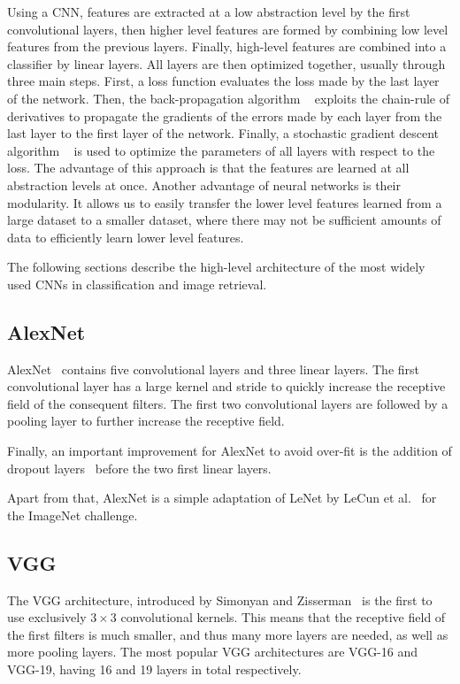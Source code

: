 Using a CNN, features are extracted at a low abstraction level by the
first convolutional layers, then higher level features are formed
by combining low level features from the previous layers. Finally,
high-level features are combined into a classifier by linear layers.
All layers are then optimized together, usually through three main steps.
First, a loss function evaluates the loss made by the last layer of
the network. Then, the back-propagation algorithm
~\cite{rumelhart_learning_1988} exploits the chain-rule of derivatives
to propagate the gradients of the errors made by each layer from the
last layer to the first layer of the network. Finally, a stochastic
gradient descent algorithm
~\cite{bottou_stochastic_2012,bottou_large-scale_2010,rumelhart_learning_1985}
is used to optimize the parameters of all layers with respect to the loss.
The advantage of this approach is that the features are learned at all
abstraction levels at once. Another advantage of neural networks is their
modularity. It allows us to easily transfer the lower level features
learned from a large dataset to a smaller dataset, where there may not
be sufficient amounts of data to efficiently learn lower level features.

The following sections describe the high-level architecture of the
most widely used CNNs in classification and image retrieval.
\subsection{AlexNet}
AlexNet~\cite{krizhevsky_imagenet_2012} contains five convolutional
layers and three linear layers. The first convolutional layer
has a large kernel and stride to quickly increase the receptive field
of the consequent filters. The first two convolutional layers are followed
by a pooling layer to further increase the receptive field.

Finally, an important improvement for AlexNet to avoid over-fit is
the addition of dropout layers~\cite{hinton_improving_2012} before the
two first linear layers.

Apart from that, AlexNet is a simple adaptation of LeNet by
LeCun et al.~\cite{lecun_gradient-based_1998} for the ImageNet challenge.

\subsection{VGG}
The VGG architecture, introduced by
Simonyan and Zisserman~\cite{simonyan_very_2014}
is the first to use exclusively $3\times3$ convolutional kernels.
This means that the receptive field of the
first filters is much smaller, and thus many more layers are needed,
as well as more pooling layers. The most popular VGG architectures
are VGG-16 and VGG-19, having 16 and 19 layers in total respectively.

